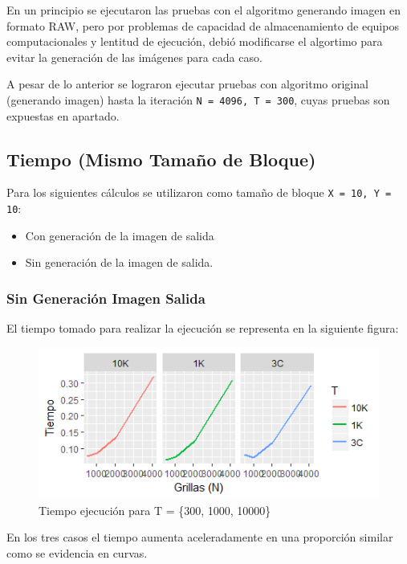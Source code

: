 \documentclass[jou]{apa6}
\begin{document}
En un principio se ejecutaron las pruebas con el algoritmo generando imagen en formato RAW, pero por problemas de capacidad de almacenamiento de equipos computacionales y lentitud de ejecución, debió modificarse el algortimo para evitar la generación de las imágenes para cada caso.

A pesar de lo anterior se lograron ejecutar pruebas con algoritmo original (generando imagen) hasta la iteración \texttt{N = 4096, T = 300}, cuyas pruebas son expuestas en apartado.

\subsection{Tiempo (Mismo Tamaño de Bloque)}

Para los siguientes cálculos se utilizaron como tamaño de bloque \texttt{X = 10, Y = 10}:

\begin{itemize}
	\item Con generación de la imagen de salida
	\item Sin generación de la imagen de salida.
\end{itemize}

\subsubsection{Sin Generación Imagen Salida}
El tiempo tomado para realizar la ejecución se representa en la siguiente figura:

\begin{figure}[h]
	\includegraphics[width=\columnwidth]{time-same-block-size-no-raw.png}
	\caption{Tiempo ejecución para T = \{300, 1000, 10000\}}
	\label{fig:Figure1}
\end{figure}

En los tres casos el tiempo aumenta aceleradamente en una proporción similar como se evidencia en curvas. 
\end{document}
